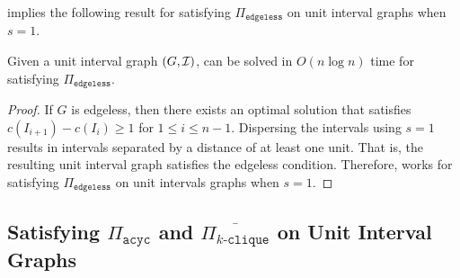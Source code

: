 
 implies the following result for satisfying $\Pi_{\texttt{edgeless}}$ on unit interval graphs when $s=1$.

\begin{mcorollaryrep}
    Given a unit interval graph $(G,\mathcal{I})$, {\gged} can be solved in $O(n\log n)$ time for satisfying $\Pi_{\texttt{edgeless}}$.
\end{mcorollaryrep}
\begin{proof}
    If $G$ is edgeless, then there exists an optimal solution that satisfies $c(I_{i+1}) - c(I_i) \ge 1$ for $1\le i \le n-1$. %
    Dispersing the intervals using $s = 1$ results in intervals separated by a distance of at least one unit. 
    That is, the resulting unit interval graph satisfies the edgeless condition. Therefore,  works for satisfying $\Pi_{\texttt{edgeless}}$ on unit intervals graphs when $s=1$. 
\end{proof}

\subsection{Satisfying \texorpdfstring{$\Pi_{\texttt{acyc}}$}{} and \texorpdfstring{$\overline{\Pi_{k\texttt{-clique}}}$}{} on Unit Interval Graphs}
\label{ssec:acyc_kclique_uig}

